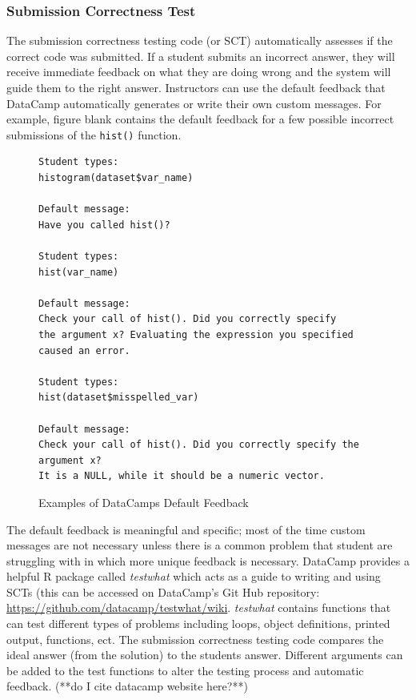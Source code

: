 \documentclass[12pt]{article}\usepackage[]{graphicx}\usepackage[]{color}
\begin{document}
\subsubsection{Submission Correctness Test}
The submission correctness testing code (or SCT) automatically assesses if the correct code was submitted. If a student submits an 
incorrect answer, they will receive immediate feedback on what they are doing wrong and the system will guide them to the right answer.
Instructors can use the default feedback that DataCamp automatically generates or write their own custom messages. For example, figure blank
contains the default feedback for a few possible incorrect submissions of the \texttt{hist()} function.

\begin{figure}
\caption{Examples of DataCamps Default Feedback}
\begin{Verbatim}[frame=single]
Student types:
histogram(dataset$var_name)

Default message:
Have you called hist()?

Student types:
hist(var_name)

Default message:
Check your call of hist(). Did you correctly specify 
the argument x? Evaluating the expression you specified
caused an error.

Student types:
hist(dataset$misspelled_var)

Default message:
Check your call of hist(). Did you correctly specify the
argument x? 
It is a NULL, while it should be a numeric vector.

\end{Verbatim}
\label{fig:code1}
\end{figure}
The default feedback is meaningful and specific; most of the time custom 
messages are not necessary unless there is a common problem that student are struggling with in which more unique feedback is necessary. 
DataCamp provides a helpful R package called \textit{testwhat} which acts as a guide to writing and using SCTs (this can be accessed on DataCamp's Git Hub 
repository: \url{https://github.com/datacamp/testwhat/wiki}. 
\textit{testwhat} contains functions that can test different types of problems including loops, object definitions, printed output, functions, ect.
The submission correctness testing code compares the ideal answer (from the solution) to the students answer. Different
arguments can be added to the test functions to alter the testing process and automatic feedback. (**do I cite datacamp website here?**)
\end{document}
